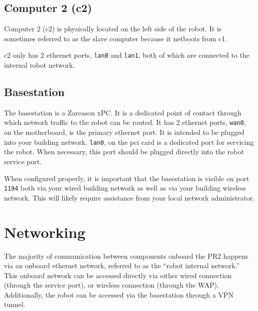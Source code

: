 \subsection{Computer 2 (c2)}
Computer 2 (c2) is physically located on the left side of the
robot. It is sometimes referred to as the slave computer because it
netboots from c1.

c2 only has 2 ethernet ports, \texttt{lan0} and \texttt{lan1}, both of
which are connected to the internal robot network.

\subsection{Basestation}
The basestation is a Zareason xPC.  It is a dedicated
point of contact through which network traffic to the robot can be
routed.  It has 2 ethernet ports, \texttt{wan0}, on the motherboard,
is the primary ethernet port.  It is intended to be plugged into your
building network.  \texttt{lan0}, on the pci card is a dedicated port
for servicing the robot.  When necessary, this port should be plugged
directly into the robot service port.

When configured properly, it is important that the basestation is
visible on port \texttt{1194} both via your wired building network as
well as via your building wireless network.  This will likely require
assistance from your local network administrator.

\section{Networking}
The majority of communication between components onboard the PR2
happens via an onboard ethernet network, referred to as the ``robot
internal network.''  This onboard network can be accessed directly via
either wired connection (through the service port), or wireless
connection (through the WAP).  Additionally, the robot can be accessed
via the basestation through a VPN tunnel.
